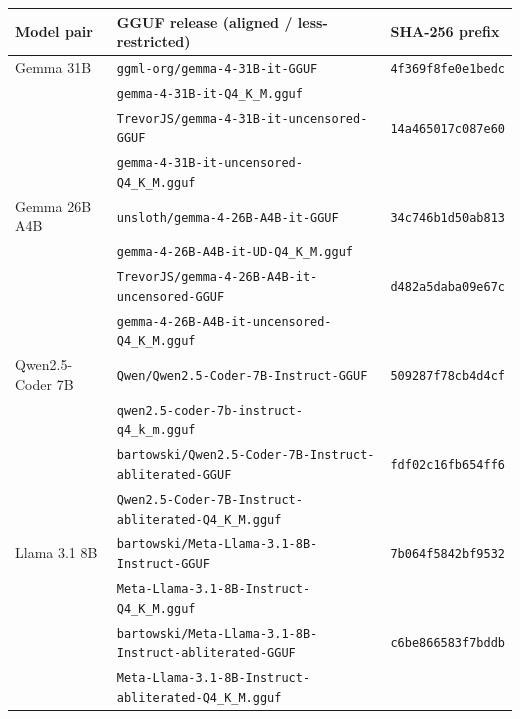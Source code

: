 \begin{tabular}{@{}lll@{}}
\toprule
Model pair & GGUF release (aligned / less-restricted) & SHA-256 prefix \\
\midrule
Gemma 31B & \texttt{ggml-org/gemma-4-31B-it-GGUF} & \texttt{4f369f8fe0e1bedc} \\
 & \quad\texttt{gemma-4-31B-it-Q4\_K\_M.gguf} & \\
 & \texttt{TrevorJS/gemma-4-31B-it-uncensored-GGUF} & \texttt{14a465017c087e60} \\
 & \quad\texttt{gemma-4-31B-it-uncensored-Q4\_K\_M.gguf} & \\
Gemma 26B A4B & \texttt{unsloth/gemma-4-26B-A4B-it-GGUF} & \texttt{34c746b1d50ab813} \\
 & \quad\texttt{gemma-4-26B-A4B-it-UD-Q4\_K\_M.gguf} & \\
 & \texttt{TrevorJS/gemma-4-26B-A4B-it-uncensored-GGUF} & \texttt{d482a5daba09e67c} \\
 & \quad\texttt{gemma-4-26B-A4B-it-uncensored-Q4\_K\_M.gguf} & \\
Qwen2.5-Coder 7B & \texttt{Qwen/Qwen2.5-Coder-7B-Instruct-GGUF} & \texttt{509287f78cb4d4cf} \\
 & \quad\texttt{qwen2.5-coder-7b-instruct-q4\_k\_m.gguf} & \\
 & \texttt{bartowski/Qwen2.5-Coder-7B-Instruct-abliterated-GGUF} & \texttt{fdf02c16fb654ff6} \\
 & \quad\texttt{Qwen2.5-Coder-7B-Instruct-abliterated-Q4\_K\_M.gguf} & \\
Llama 3.1 8B & \texttt{bartowski/Meta-Llama-3.1-8B-Instruct-GGUF} & \texttt{7b064f5842bf9532} \\
 & \quad\texttt{Meta-Llama-3.1-8B-Instruct-Q4\_K\_M.gguf} & \\
 & \texttt{bartowski/Meta-Llama-3.1-8B-Instruct-abliterated-GGUF} & \texttt{c6be866583f7bddb} \\
 & \quad\texttt{Meta-Llama-3.1-8B-Instruct-abliterated-Q4\_K\_M.gguf} & \\
\bottomrule
\end{tabular}
